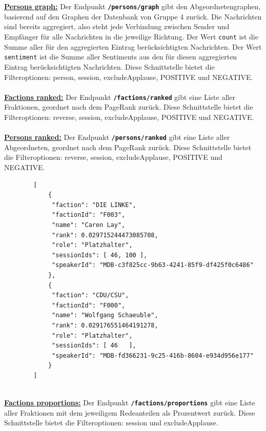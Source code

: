 \\~\\
\textbf{\underline{Persons graph:}}\newline
Der Endpunkt \textbf{\texttt{/persons/graph}} gibt den Abgeordnetengraphen, basierend auf den Graphen der Datenbank von Gruppe 4 zurück. 
Die Nachrichten sind bereits aggregiert, also steht jede Verbindung zwischen Sender und Empfänger für alle Nachrichten in die jeweilige Richtung. Der Wert \texttt{count} ist die Summe aller für den aggregierten Eintrag berücksichtigten Nachrichten. Der Wert \texttt{sentiment} ist die Summe aller Sentiments aus den für diesen aggregierten Eintrag berücksichtigten Nachrichten. Diese Schnittstelle bietet die Filteroptionen: person, session, excludeApplause, POSITIVE und NEGATIVE.	
\\~\\
\textbf{\underline{Factions ranked:}}\newline
Der Endpunkt \textbf{\texttt{/factions/ranked}} gibt eine Liste aller Fraktionen, geordnet nach dem PageRank zurück. Diese Schnittstelle bietet die Filteroptionen: reverse, session, excludeApplause, POSITIVE und NEGATIVE.
\\~\\
\textbf{\underline{Persons ranked:}}\newline
Der Endpunkt \textbf{\texttt{/persons/ranked}} gibt eine Liste aller Abgeordneten, geordnet nach dem PageRank zurück. Diese Schnittstelle bietet die Filteroptionen: reverse, session, excludeApplause, POSITIVE und NEGATIVE.
~\\
\begin{lstlisting}
		[
			{
			 "faction": "DIE LINKE",
			 "factionId": "F003", 
			 "name": "Caren Lay", 
			 "rank": 0.029715244473085708, 
			 "role": "Platzhalter",
			 "sessionIds": [ 46, 100 ],
			 "speakerId": "MDB-c3f825cc-9b63-4241-85f9-df425f0c6486"
			}, 
			{
			 "faction": "CDU/CSU",    
			 "factionId": "F000",
			 "name": "Wolfgang Schaeuble", 
			 "rank": 0.029176551464191278, 
			 "role": "Platzhalter",   
			 "sessionIds": [ 46   ], 
			 "speakerId": "MDB-fd366231-9c25-416b-8604-e934d956e177"
			}
		]
\end{lstlisting}
~\\	
\textbf{\underline{Factions proportions:}}\newline
Der Endpunkt \textbf{\texttt{/factions/proportions}} gibt eine Liste aller Fraktionen mit dem jeweiligem Redeanteilen als Prozentwert zurück. Diese Schnittstelle bietet die Filteroptionen: session und excludeApplause.
